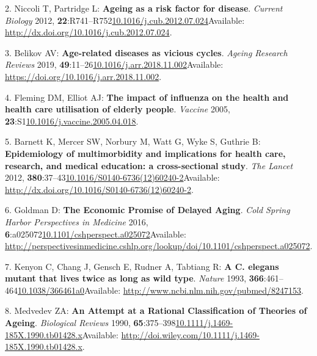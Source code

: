 \documentclass[
]{book}
\begin{document}
\leavevmode\hypertarget{ref-Niccoli2012}{}%
2. Niccoli T, Partridge L: \textbf{Ageing as a risk factor for disease}. \emph{Current Biology} 2012, \textbf{22}:R741--R752\href{https://doi.org/10.1016/j.cub.2012.07.024}{10.1016/j.cub.2012.07.024}Available: \url{http://dx.doi.org/10.1016/j.cub.2012.07.024}.

\leavevmode\hypertarget{ref-Belikov2019}{}%
3. Belikov AV: \textbf{Age-related diseases as vicious cycles}. \emph{Ageing Research Reviews} 2019, \textbf{49}:11--26\href{https://doi.org/10.1016/j.arr.2018.11.002}{10.1016/j.arr.2018.11.002}Available: \url{https://doi.org/10.1016/j.arr.2018.11.002}.

\leavevmode\hypertarget{ref-Fleming2005}{}%
4. Fleming DM, Elliot AJ: \textbf{The impact of influenza on the health and health care utilisation of elderly people}. \emph{Vaccine} 2005, \textbf{23}:S1\href{https://doi.org/10.1016/j.vaccine.2005.04.018}{10.1016/j.vaccine.2005.04.018}.

\leavevmode\hypertarget{ref-Barnett2012}{}%
5. Barnett K, Mercer SW, Norbury M, Watt G, Wyke S, Guthrie B: \textbf{Epidemiology of multimorbidity and implications for health care, research, and medical education: a cross-sectional study}. \emph{The Lancet} 2012, \textbf{380}:37--43\href{https://doi.org/10.1016/S0140-6736(12)60240-2}{10.1016/S0140-6736(12)60240-2}Available: \url{http://dx.doi.org/10.1016/S0140-6736(12)60240-2}.

\leavevmode\hypertarget{ref-Goldman2016}{}%
6. Goldman D: \textbf{The Economic Promise of Delayed Aging}. \emph{Cold Spring Harbor Perspectives in Medicine} 2016, \textbf{6}:a025072\href{https://doi.org/10.1101/cshperspect.a025072}{10.1101/cshperspect.a025072}Available: \url{http://perspectivesinmedicine.cshlp.org/lookup/doi/10.1101/cshperspect.a025072}.

\leavevmode\hypertarget{ref-Kenyon1993}{}%
7. Kenyon C, Chang J, Gensch E, Rudner A, Tabtiang R: \textbf{A C. elegans mutant that lives twice as long as wild type}. \emph{Nature} 1993, \textbf{366}:461--464\href{https://doi.org/10.1038/366461a0}{10.1038/366461a0}Available: \url{http://www.ncbi.nlm.nih.gov/pubmed/8247153}.

\leavevmode\hypertarget{ref-Medvedev1990}{}%
8. Medvedev ZA: \textbf{An Attempt at a Rational Classification of Theories of Ageing}. \emph{Biological Reviews} 1990, \textbf{65}:375--398\href{https://doi.org/10.1111/j.1469-185X.1990.tb01428.x}{10.1111/j.1469-185X.1990.tb01428.x}Available: \url{http://doi.wiley.com/10.1111/j.1469-185X.1990.tb01428.x}.
\end{document}
